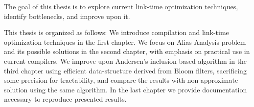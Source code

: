 The goal of this thesis is to explore current link-time optimization
techniques, identify bottlenecks, and improve upon it. 

This thesis is organized as follows: We introduce compilation and link-time
optimization techniques in the first chapter. We focus on Alias Analysis problem
and its possible solutions in the second chapter, with emphasis on practical
use in current compilers. We improve upon Andersen's inclusion-based algorithm
in the third chapter using efficient data-structure derived from Bloom
filters, sacrificing some precision for tractability, and compare the results
with non-approximate solution using the same algorithm. In the last chapter we
provide documentation necessary to reproduce presented results.



%
%
%
%
%
%
%
%
